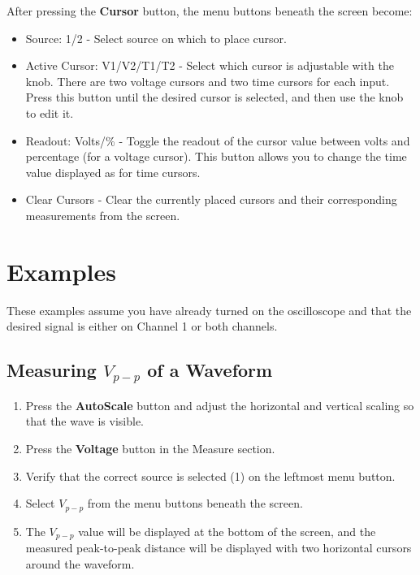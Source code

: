 \documentclass{article}
\begin{document}
After pressing the \textbf{Cursor} button, the menu buttons beneath the screen become:
\begin{itemize}
\item Source: 1/2  -  Select source on which to place cursor.
\item Active Cursor: V1/V2/T1/T2  -  Select which cursor is adjustable with the knob. There are two voltage cursors and two time cursors for each input. Press this button until the desired cursor is selected, and then use the knob to edit it.
\item Readout: Volts/\%  -  Toggle the readout of the cursor value between volts and percentage (for a voltage cursor). This button allows you to change the time value displayed as for time cursors.
\item Clear Cursors  -  Clear the currently placed cursors and their corresponding measurements from the screen.
\end{itemize}

\section{Examples}
These examples assume you have already turned on the oscilloscope and that the desired signal is either on Channel 1 or both channels.

\subsection{Measuring $V_{p-p}$ of a Waveform}
\begin{enumerate}
\item Press the \textbf{AutoScale} button and adjust the horizontal and vertical scaling so that the wave is visible.
\item Press the \textbf{Voltage} button in the Measure section.
\item Verify that the correct source is selected (1) on the leftmost menu button.
\item Select $V_{p-p}$ from the menu buttons beneath the screen.
\item The $V_{p-p}$ value will be displayed at the bottom of the screen, and the measured peak-to-peak distance will be displayed with two horizontal cursors around the waveform.
\end{enumerate}
\end{document}
